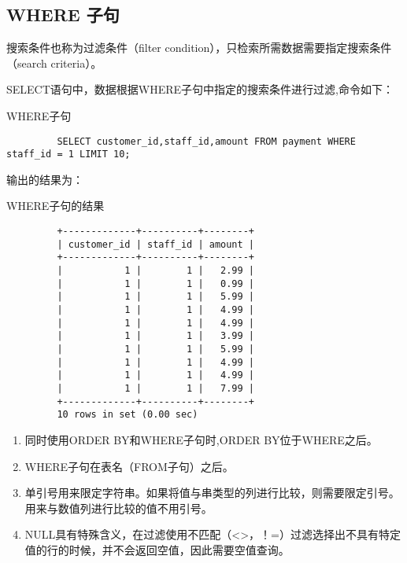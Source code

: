 \documentclass[UTF8]{article}
\begin{document}
\subsection{WHERE 子句}
    
\begin{redbox}[frametitle={Defination 6.1 搜索条件（search criteria）}]
        搜索条件也称为过滤条件（filter condition），只检索所需数据需要指定搜索条件（search criteria）。
\end{redbox}
SELECT语句中，数据根据WHERE子句中指定的搜索条件进行过滤,命令如下：
\begin{listing}[H]
	\caption{WHERE子句}
	\label{code:whereclause}
	\begin{verbatim}
         SELECT customer_id,staff_id,amount FROM payment WHERE staff_id = 1 LIMIT 10;
        \end{verbatim}
\end{listing}

输出的结果为：

\begin{listing}[H]
	\caption{WHERE子句的结果}
	\label{code:whereclauseresult}
	\begin{verbatim}
         +-------------+----------+--------+
         | customer_id | staff_id | amount |
         +-------------+----------+--------+
         |           1 |        1 |   2.99 |
         |           1 |        1 |   0.99 |
         |           1 |        1 |   5.99 |
         |           1 |        1 |   4.99 |
         |           1 |        1 |   4.99 |
         |           1 |        1 |   3.99 |
         |           1 |        1 |   5.99 |
         |           1 |        1 |   4.99 |
         |           1 |        1 |   4.99 |
         |           1 |        1 |   7.99 |
         +-------------+----------+--------+
         10 rows in set (0.00 sec)

        \end{verbatim}
\end{listing}

\begin{orangebox}[frametitle={Tips 6.1}]
        \begin{enumerate}
            \item 同时使用ORDER BY和WHERE子句时,ORDER BY位于WHERE之后。
            \item WHERE子句在表名（FROM子句）之后。
            \item 单引号用来限定字符串。如果将值与串类型的列进行比较，则需要限定引号。用来与数值列进行比较的值不用引号。
            \item NULL具有特殊含义，在过滤使用不匹配（<>，！=）过滤选择出不具有特定值的行的时候，并不会返回空值，因此需要空值查询。
        \end{enumerate}
\end{orangebox}
\end{document}
